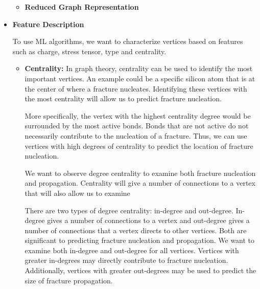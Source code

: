 \begin{itemize}
\begin{itemize}
    \item \textbf{Reduced Graph Representation}
    \\
    
    
\end{itemize}


\item \textbf{Feature Description}
\bigskip

To use ML algorithms, we want to characterize vertices based on features such as charge, stress tensor, type and centrality.

\begin{itemize}
    \item \textbf{Centrality:} In graph theory, centrality can be used to identify the most important vertices. An example could be a specific silicon atom that is at the center of where a fracture nucleates. Identifying these vertices with the most centrality will allow us to predict fracture nucleation.
    
    \bigskip
    
    More specifically, the vertex with the highest centrality degree would be surrounded by the most active bonds. Bonds that are not active do not necessarily contribute to the nucleation of a fracture. Thus, we can use vertices with high degrees of centrality to predict the location of fracture nucleation.
    
    \bigskip
    
    We want to observe degree centrality to examine both fracture nucleation and propagation. Centrality will give a number of connections to a vertex that will also allow us to examine 
    
    There are two types of degree centrality: in-degree and out-degree. In-degree gives a number of connections to a vertex and out-degree gives a number of connections that a vertex directs to other vertices. Both are significant to predicting fracture nucleation and propagation. We want to examine both in-degree and out-degree for all vertices. Vertices with greater in-degrees may directly contribute to fracture nucleation. Additionally, vertices with greater out-degrees may be used to predict the size of fracture propagation.
    
\end{itemize}







\\


\end{itemize}
